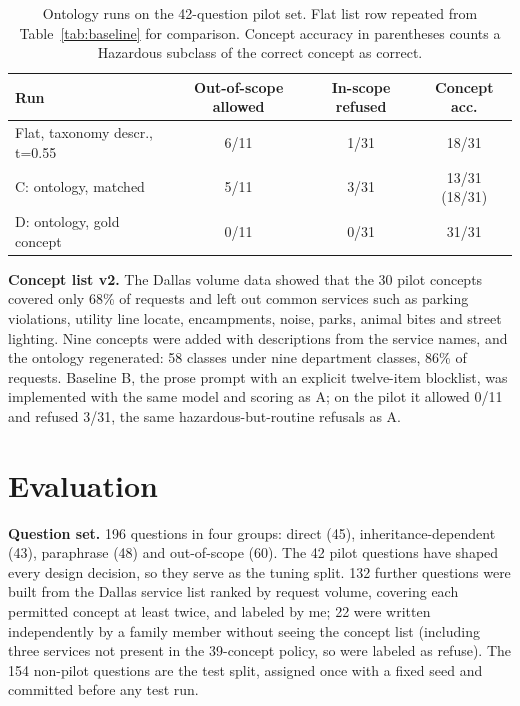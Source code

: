 \documentclass[conference]{IEEEtran}
\begin{document}
\begin{table}[h]
\centering
\caption{Ontology runs on the 42-question pilot set. Flat list row repeated from Table~\ref{tab:baseline} for comparison. Concept accuracy in parentheses counts a Hazardous subclass of the correct concept as correct.}
\label{tab:ontology}
\begin{tabular}{lccc}
\toprule
Run & Out-of-scope allowed & In-scope refused & Concept acc. \\
\midrule
Flat, taxonomy descr., t=0.55 & 6/11 & 1/31 & 18/31 \\
C: ontology, matched          & 5/11 & 3/31 & 13/31 (18/31) \\
D: ontology, gold concept     & 0/11 & 0/31 & 31/31 \\
\bottomrule
\end{tabular}
\end{table}

\textbf{Concept list v2.} The Dallas volume data showed that the 30 pilot concepts covered only 68\% of requests and left out common services such as parking violations, utility line locate, encampments, noise, parks, animal bites and street lighting. Nine concepts were added with descriptions from the service names, and the ontology regenerated: 58 classes under nine department classes, 86\% of requests. Baseline B, the prose prompt with an explicit twelve-item blocklist, was implemented with the same model and scoring as A; on the pilot it allowed 0/11 and refused 3/31, the same hazardous-but-routine refusals as A.

\section{Evaluation}

\textbf{Question set.} 196 questions in four groups: direct (45), inheritance-dependent (43), paraphrase (48) and out-of-scope (60). The 42 pilot questions have shaped every design decision, so they serve as the tuning split. 132 further questions were built from the Dallas service list ranked by request volume, covering each permitted concept at least twice, and labeled by me; 22 were written independently by a family member without seeing the concept list (including three  services not present in the 39-concept policy, so were labeled as refuse). The 154 non-pilot questions are the test split, assigned once with a fixed seed and committed before any test run.
\end{document}

